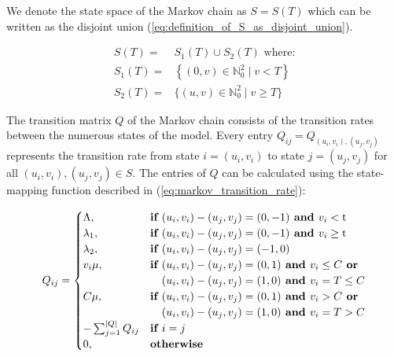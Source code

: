 We denote the state space of the Markov chain as  \(S=S(T)\) which can be 
written as the disjoint union (\ref{eq:definition_of_S_as_disjoint_union}).

\begin{align}
    S(T) =& S_1(T) \cup S_2(T) \text{ where:} \nonumber \\
    S_1(T) =& \left\{(0, v)\in\mathbb{N}_0^2 \; | \; v < T \right\} 
    \label{eq:definition_of_S_as_disjoint_union} \\
    S_2(T) =& \{(u, v)\in\mathbb{N}_0^2 \; | \; v \geq T \} \nonumber
\end{align}

The transition matrix \(Q\) of the Markov chain consists of the transition rates
between the numerous states of the model. Every entry \( Q_{ij} = 
Q_{(u_i, v_i),(u_j, v_j)} \) represents the transition rate from state 
\( i = (u_i, v_i) \) to state \( j = (u_j , v_j) \) for all 
\( (u_i, v_i), (u_j, v_j) \in S \).
The entries of \(Q\) can be calculated using the state-mapping function 
described in (\ref{eq:markov_transition_rate}): 

\begin{equation} \label{eq:markov_transition_rate}
    Q_{ij} = 
    \begin{cases}
        \Lambda, & \textbf{if } (u_i, v_i) - (u_j, v_j) = (0,-1) \textbf{ and } 
        v_i < \text{t} \\
        \lambda_1, & \textbf{if } (u_i, v_i) - (u_j, v_j) = (0,-1) 
        \textbf{ and } v_i \geq \text{t} \\
        \lambda_2, & \textbf{if } (u_i, v_i) - (u_j, v_j) = (-1,0) \\
        v_i \mu, & \textbf{if } (u_i, v_i) - (u_j, v_j) = (0,1) \textbf{ and } 
        v_i \leq C \textbf{ or} \\ & \hspace{0.37cm}(u_i, v_i) - (u_j, v_j) = 
        (1,0) \textbf{ and } v_i = T \leq C \\
        C \mu, & \textbf{if } (u_i, v_i) - (u_j, v_j) = (0,1) \textbf{ and } 
        v_i > C 
        \textbf{ or} \\ & \hspace{0.37cm}(u_i, v_i) - (u_j, v_j) = (1,0) 
        \textbf{ and } v_i = T > C\\
        -\sum_{j=1}^{|Q|}{Q_{ij}} & \textbf{if } i = j \\
        0, & \textbf{otherwise}
    \end{cases}
\end{equation}

